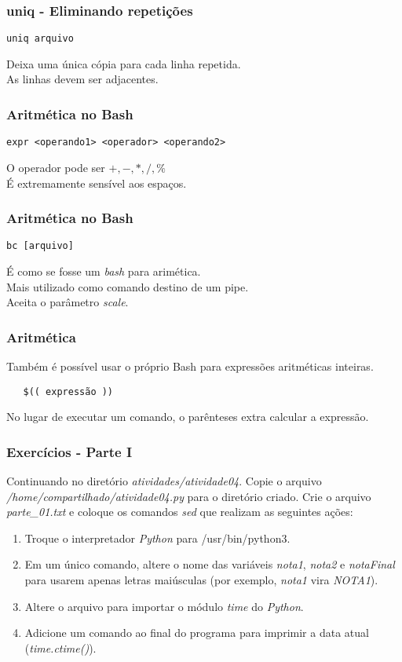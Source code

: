 \documentclass{beamer}
\begin{document}
\begin{frame}[fragile]
   \frametitle{uniq - Eliminando repetições}
   \begin{verbatim}
uniq arquivo 
   \end{verbatim}
   Deixa uma única cópia para cada linha repetida. \\
   As linhas devem ser adjacentes. \\
\end{frame}

\begin{frame}[fragile]
   \frametitle{Aritmética no Bash}
   \begin{verbatim}
expr <operando1> <operador> <operando2>
   \end{verbatim}
   O operador pode ser $+,-,*,/,\%$ \\
   É extremamente sensível aos espaços. \\
\end{frame}

\begin{frame}[fragile]
   \frametitle{Aritmética no Bash}
   \begin{verbatim}
bc [arquivo]
   \end{verbatim}
   É como se fosse um \textit{bash} para arimética. \\
   Mais utilizado como comando destino de um pipe. \\
   Aceita o parâmetro \textit{scale}.\\
\end{frame}

\begin{frame}[fragile]
   \frametitle{Aritmética}
   Também é possível usar o próprio Bash para expressões aritméticas inteiras.
   \begin{verbatim}
   $(( expressão ))
   \end{verbatim}
   No lugar de executar um comando, o parênteses extra calcular a expressão. \\
\end{frame}

\begin{frame}
   \frametitle{Exercícios - Parte I}
   Continuando no diretório \textit{atividades/atividade04}. Copie o arquivo \textit{/home/compartilhado/atividade04.py} para o diretório criado. Crie o arquivo \textit{parte\_01.txt} e coloque os comandos \textit{sed} que realizam as seguintes ações:
   \begin{enumerate}
      \item Troque o interpretador \textit{Python} para {/usr/bin/python3}.
      \item Em um único comando, altere o nome das variáveis \textit{nota1}, \textit{nota2} e \textit{notaFinal} para usarem apenas letras maiúsculas (por exemplo, \textit{nota1} vira \textit{NOTA1}).
      \item Altere o arquivo para importar o módulo \textit{time} do \textit{Python}.
      \item Adicione um comando ao final do programa para imprimir a data atual (\textit{time.ctime()}).
   \end{enumerate}
\end{frame}
\end{document}
